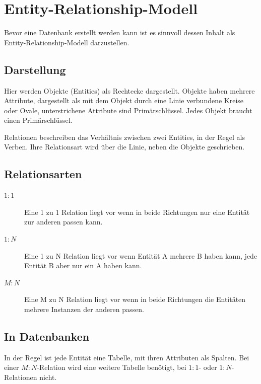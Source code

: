 \documentclass{article}
\begin{document}
\section{Entity-Relationship-Modell} 
Bevor eine Datenbank erstellt werden kann ist es sinnvoll dessen Inhalt als Entity-Relationship-Modell darzustellen.

\subsection{Darstellung}
Hier werden Objekte (Entities) als Rechtecke dargestellt. Objekte haben mehrere Attribute, dargestellt als mit dem Objekt durch eine Linie verbundene Kreise oder Ovale, unterstrichene Attribute sind Primärschlüssel. Jedes Objekt braucht einen Primärschlüssel.

Relationen beschreiben das Verhältnis zwischen zwei Entities, in der Regel als Verben. Ihre Relationsart wird über die Linie, neben die Objekte geschrieben.

\subsection{Relationsarten}
\begin{description}
 \item[$1:1$] Eine 1 zu 1 Relation liegt vor wenn in beide Richtungen nur eine Entität zur anderen passen kann.
 \item[$1:N$] Eine 1 zu N Relation liegt vor wenn Entität A mehrere B haben kann, jede Entität B aber nur ein A haben kann. 
 \item[$M:N$] Eine M zu N Relation liegt vor wenn in beide Richtungen die Entitäten mehrere Instanzen der anderen passen. 
\end{description}

\subsection{In Datenbanken}
In der Regel ist jede Entität eine Tabelle, mit ihren Attributen als Spalten. Bei einer $M:N$-Relation wird eine weitere Tabelle benötigt, bei $1:1$- oder $1:N$-Relationen nicht.
\end{document}
